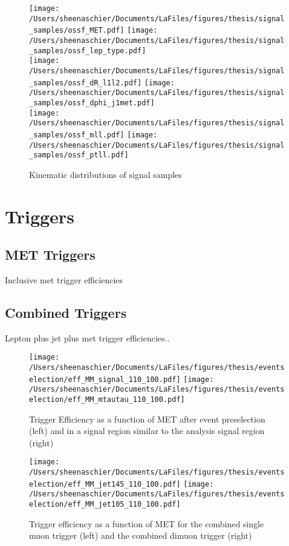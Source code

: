    \begin{figure}[tbp]
\texttt{[image: /Users/sheenaschier/Documents/LaFiles/figures/thesis/signal\_samples/ossf\_MET.pdf]}
\texttt{[image: /Users/sheenaschier/Documents/LaFiles/figures/thesis/signal\_samples/ossf\_lep\_type.pdf]}\\
 \texttt{[image: /Users/sheenaschier/Documents/LaFiles/figures/thesis/signal\_samples/ossf\_dR\_l1l2.pdf]}
 \texttt{[image: /Users/sheenaschier/Documents/LaFiles/figures/thesis/signal\_samples/ossf\_dphi\_j1met.pdf]}\\
 \texttt{[image: /Users/sheenaschier/Documents/LaFiles/figures/thesis/signal\_samples/ossf\_mll.pdf]}
 \texttt{[image: /Users/sheenaschier/Documents/LaFiles/figures/thesis/signal\_samples/ossf\_ptll.pdf]}\\
   \caption{Kinematic distributions of signal samples}
   \label{fig:SigSample2}
 \end{figure}

 \FloatBarrier
\section{Triggers}
\label{sec:eff}

\subsection{MET Triggers}
\label{sec:met}
Inclusive met trigger efficiencies

\subsection{Combined Triggers}
Lepton plus jet plus met trigger efficiencies..

  \begin{figure}[tbp]
     \texttt{[image: /Users/sheenaschier/Documents/LaFiles/figures/thesis/eventselection/eff\_MM\_signal\_110\_100.pdf]}
       \texttt{[image: /Users/sheenaschier/Documents/LaFiles/figures/thesis/eventselection/eff\_MM\_mtautau\_110\_100.pdf]}\\
   \caption{Trigger Efficiency as a function of MET after event preselection (left) and in a signal region similar to the analysis signal region (right)}
   \label{fig:TrigEff1}
 \end{figure}
 
   \begin{figure}[tbp]
     \texttt{[image: /Users/sheenaschier/Documents/LaFiles/figures/thesis/eventselection/eff\_MM\_jet145\_110\_100.pdf]}
       \texttt{[image: /Users/sheenaschier/Documents/LaFiles/figures/thesis/eventselection/eff\_MM\_jet105\_110\_100.pdf]}\\
   \caption{Trigger efficiency as a function of MET for the combined single muon trigger (left) and the combined dimuon trigger (right)}
   \label{fig:TrigEff2}
 \end{figure}

